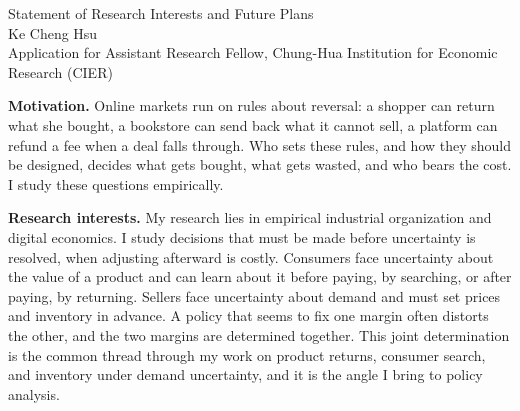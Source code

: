 \documentclass[11pt,letterpaper]{article}
\begin{document}
\begin{center}
{\Large Statement of Research Interests and Future Plans}\\[0.25em]
Ke Cheng Hsu \\[0.15em]
{\small Application for Assistant Research Fellow, Chung-Hua Institution for Economic Research (CIER)}
\end{center}

\noindent\textbf{Motivation.} Online markets run on rules about reversal: a shopper can return what she bought, a bookstore can send back what it cannot sell, a platform can refund a fee when a deal falls through. Who sets these rules, and how they should be designed, decides what gets bought, what gets wasted, and who bears the cost. I study these questions empirically.

\medskip
\noindent\textbf{Research interests.} My research lies in empirical industrial organization and digital economics. I study decisions that must be made before uncertainty is resolved, when adjusting afterward is costly. Consumers face uncertainty about the value of a product and can learn about it before paying, by searching, or after paying, by returning. Sellers face uncertainty about demand and must set prices and inventory in advance. A policy that seems to fix one margin often distorts the other, and the two margins are determined together. This joint determination is the common thread through my work on product returns, consumer search, and inventory under demand uncertainty, and it is the angle I bring to policy analysis.
\end{document}
